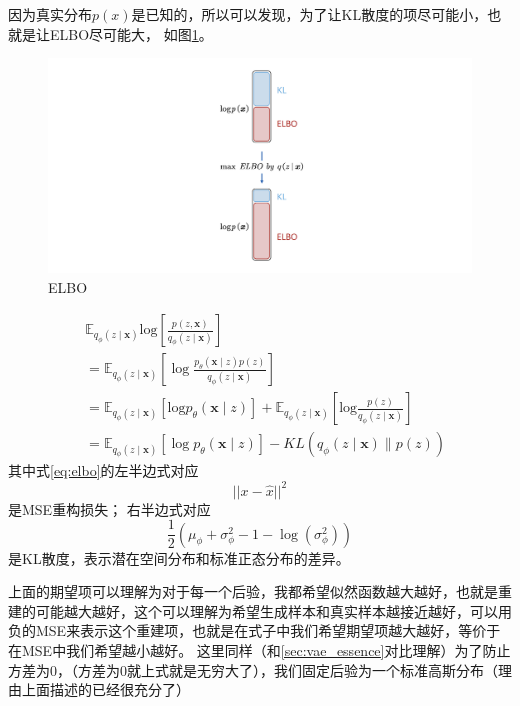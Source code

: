 因为真实分布$p(x)$是已知的，所以可以发现，为了让KL散度的项尽可能小，也就是让ELBO尽可能大， 如图\ref{fig:elbo}。
\begin{figure}[htbp]
    \centering
    \includegraphics[width=\textwidth]{figures/chapter2/elbo.png}
    \caption{ELBO}
    \label{fig:elbo}
\end{figure}
\begin{align}
 & \mathbb{E}_{q_\phi(z\mid\boldsymbol{x})}\mathrm{log}{\left[\frac{p(z,\boldsymbol{x})}{q_\phi(z\mid\boldsymbol{x})}\right]} \\
 & =\mathbb{E}_{q_\phi(z\mid\boldsymbol{x})}{\left[\log\frac{p_\theta\left(\boldsymbol{x}\mid z\right)p(z)}{q_\phi\left(z\mid\boldsymbol{x}\right)}\right]}\quad \\
 & =\mathbb{E}_{q_\phi(z\mid\boldsymbol{x})}[\mathrm{log}p_\theta(\boldsymbol{x}\mid z)]+\mathbb{E}_{q_\phi(z\mid\boldsymbol{x})}[\mathrm{log}\frac{p(z)}{q_\phi(z\mid\boldsymbol{x})}] \\
 & =\mathbb{E}_{q_\phi(z\mid\boldsymbol{x})}[\log p_\theta(\boldsymbol{x}\mid z)]-KL\left(q_\phi(z\mid\boldsymbol{x})\|p\left(z\right)\right) 
 \label{eq:elbo}
\end{align}
其中式\ref{eq:elbo}的左半边式对应
\begin{equation}
    ||x-\hat{x}||^2
\end{equation}
是MSE重构损失；
右半边式对应
\begin{equation}
    \frac{1}{2}\left( \mu_\phi + \sigma_\phi^2 - 1 - \log(\sigma_\phi^2) \right)
\end{equation}
是KL散度，表示潜在空间分布和标准正态分布的差异。

上面的期望项可以理解为对于每一个后验，我都希望似然函数越大越好，也就是重建的可能越大越好，这个可以理解为希望生成样本和真实样本越接近越好，可以用负的MSE来表示这个重建项，也就是在式子中我们希望期望项越大越好，等价于在MSE中我们希望越小越好。
这里同样（和\ref{sec:vae_essence}对比理解）为了防止方差为0，（方差为0就上式就是无穷大了），我们固定后验为一个标准高斯分布（理由上面描述的已经很充分了）

